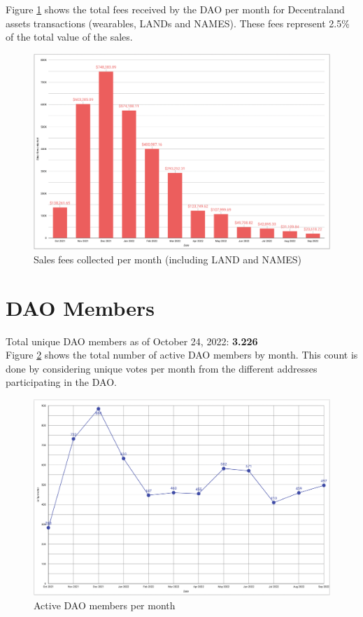 \documentclass[MSE,Master,english]{twbook}%
\begin{document}
Figure \ref{fig:sales_fees} shows the total fees received by the DAO per month for Decentraland assets transactions (wearables, LANDs and NAMES). These fees represent 2.5\% of the total value of the sales.
\begin{figure}[H]
  \centering
  \includegraphics[width=\textwidth]{metrics/sales_fees.png}
  \caption{Sales fees collected per month (including LAND and NAMES)}
  \label{fig:sales_fees}
\end{figure}

\section{DAO Members}
Total unique DAO members as of October 24, 2022: \textbf{3.226} \\

Figure \ref{fig:active_members} shows the total number of active DAO members by month. This count is done by considering unique votes per month from the different addresses participating in the DAO.
\begin{figure}[H]
  \centering
  \includegraphics[width=\textwidth]{metrics/active_members.png}
  \caption{Active DAO members per month}
  \label{fig:active_members}
\end{figure}
\end{document}
